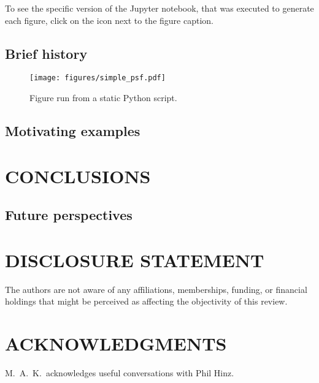 \documentclass[letterpaper]{ar-1col}
\newcommand{\project}[1]{\textsf{#1}}
\begin{document}
To see the specific version of the \project{Jupyter} notebook, that was executed to generate each figure, click on the icon next to the figure caption.

\subsection{Brief history}


\begin{figure}[ht]
  \centering
  \texttt{[image: figures/simple\_psf.pdf]}
  \caption{Figure run from a static Python script.}
  \label{fig:simplepsf}
\end{figure}


\lipsum[2-4]

\subsection{Motivating examples}
\label{sec:sim_examples}
\lipsum[2-4]


\section{CONCLUSIONS}
\label{sec:concl}
\lipsum[2-4]

\lipsum[2-4]


\subsection{Future perspectives}

\lipsum[2-4]

\section*{DISCLOSURE STATEMENT}
The authors are not aware of any affiliations, memberships, funding, or financial holdings that
might be perceived as affecting the objectivity of this review.

\section*{ACKNOWLEDGMENTS}
M.\ A.\ K.\ acknowledges useful conversations with
Phil Hinz.

\end{document}
